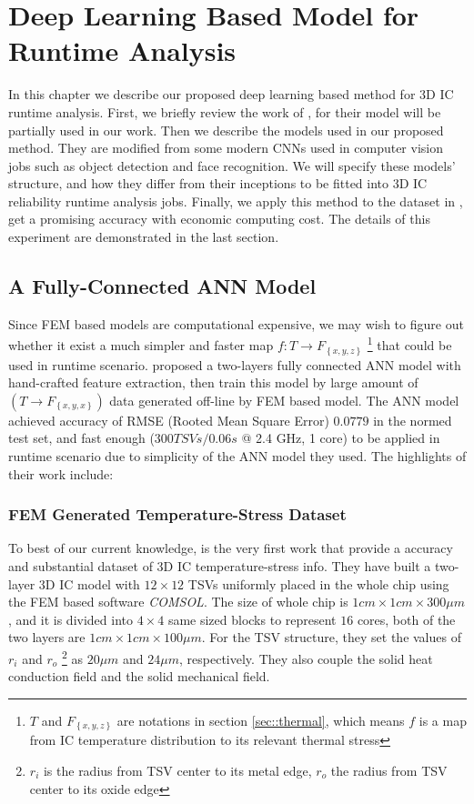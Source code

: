 
\chapter{Deep Learning Based Model for Runtime Analysis} \label{chap::Model}
In this chapter we describe our proposed deep learning based method for 3D IC runtime analysis.
First, we briefly review the work of \cite{Zhang2016Fast}, for their model
will be partially used in our work.
Then we describe the models used in our proposed method. They are modified from some modern
CNNs used in computer vision jobs such as object detection and face recognition.
We will specify these models' structure, and how they differ from their inceptions
to be fitted into 3D IC reliability runtime analysis jobs.
Finally, we apply this method to the dataset in \cite{Zhang2016Fast},
get a promising accuracy with economic computing cost.
The details of this experiment are demonstrated in the last section.

\section{A Fully-Connected ANN Model}
Since FEM based models are computational expensive, we may wish to figure out whether
it exist a much simpler and faster map $f: T \to F_{\left\{ x,y,z \right\}}$
\footnote{$T$ and $F_{\left\{ x,y,z \right\}}$ are notations in section \ref{sec::thermal}, which means
$f$ is a map from IC temperature distribution to its relevant thermal stress}
that could be used in runtime scenario.
\cite{Zhang2016Fast} proposed a two-layers fully connected ANN model with hand-crafted
feature extraction, then train this model by large amount of $(T \to F_{\left\{x,y,x\right\}})$ data
generated off-line by FEM based model. 
The ANN model achieved accuracy of RMSE (Rooted Mean Square Error) $0.0779$
in the normed test set, and fast enough 
($300 TSVs / 0.06s$ @ 2.4 GHz, 1 core) to be applied
in runtime scenario due to simplicity of the ANN model they used.
The highlights of their work include:

\subsection{FEM Generated Temperature-Stress Dataset} \label{sec::FEM-data}
To best of our current knowledge, \cite{Zhang2016Fast} is the very first work that provide a
accuracy and substantial dataset of 3D IC temperature-stress info.
They have built a two-layer 3D IC model with $12\times12$ TSVs uniformly placed
in the whole chip using the FEM based software \textit{COMSOL}.
The size of whole chip is $1cm\times1cm\times300\mu m$, and it is
divided into $4\times4$ same sized blocks to represent $16$ cores,
both of the two layers are $1cm\times1cm\times100\mu m$. 
For the TSV structure, they set the values of $r_i$ and $r_o$
\footnote{$r_i$ is the radius from TSV center to its metal edge,
$r_o$ the radius from TSV center to its oxide edge}
as $20\mu m$ and $24\mu m$, respectively. They also couple
the solid heat conduction field and the solid mechanical field.

